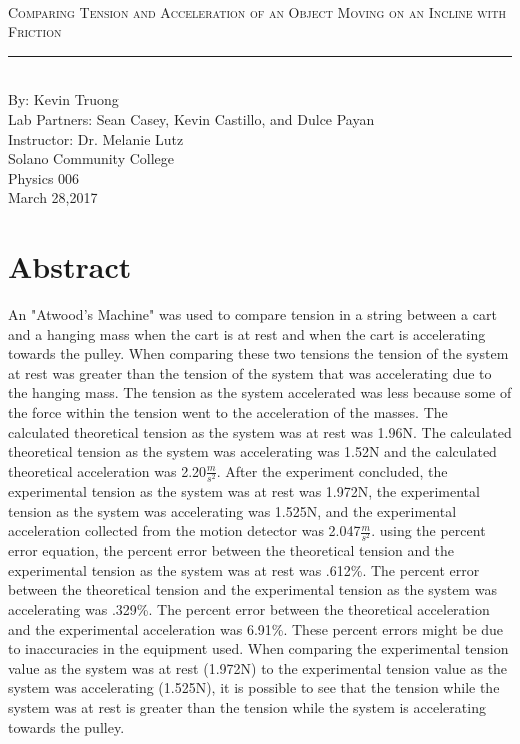 \documentclass[aps,letterpaper,11pt]{revtex4}
\newcommand{\labno}{6}
\newcommand{\labtitle}{Comparing Tension and Acceleration of an Object Moving on an Incline with Friction}
\newcommand{\authorname}{Kevin Truong}
\newcommand{\professor}{Dr. Melanie Lutz}
\newcommand{\classno}{Physics 006}
\newcommand{\labpartners}{Sean Casey, Kevin Castillo, and Dulce Payan}
\newcommand{\submitdate}{March 28,2017}
\begin{document}
\begin{titlepage}
\begin{center}
\hspace{-136mm}\boxed{{\Large \textsc{Lab No. \labno}}}\\\vspace{30mm}
{\Large \textsc{\labtitle} \\ \vspace{4pt}}
\rule[13pt]{\textwidth}{1pt}\\ \vspace{150pt}
{\large By: \authorname \\ \vspace{10pt}}
Lab Partners: \labpartners \\
Instructor: \professor \vspace{10pt} \\
Solano Community College\\ \classno \\ \vspace{10pt}
\submitdate
\end{center}
\end{titlepage}

\section{Abstract}

An "Atwood's Machine" was used to compare tension in a string between a cart and a hanging mass when the cart is at rest and when the cart is accelerating towards the pulley. When comparing these two tensions the tension of the system at rest was greater than the tension of the system that was accelerating due to the hanging mass. The tension as the system accelerated was less because some of the force within the tension went to the acceleration of the masses. The calculated theoretical tension as the system was at rest was 1.96N. The calculated theoretical tension as the system was accelerating was 1.52N and the calculated theoretical acceleration was 2.20$\frac{m}{s^2}$. After the experiment concluded, the experimental tension as the system was at rest was 1.972N, the experimental tension as the system was accelerating was 1.525N, and the experimental acceleration collected from the motion detector was 2.047$\frac{m}{s^2}$. using the percent error equation, the percent error between the theoretical tension and the experimental tension as the system was at rest was .612\%. The percent error between the theoretical tension and the experimental tension as the system was accelerating was .329\%. The percent error between the theoretical acceleration and the experimental acceleration was 6.91\%. These percent errors might be due to inaccuracies in the equipment used. When comparing the experimental tension value as the system was at rest (1.972N) to the experimental tension value as the system was accelerating (1.525N), it is possible to see that the tension while the system was at rest is greater than the tension while the system is accelerating towards the pulley.
\end{document}
